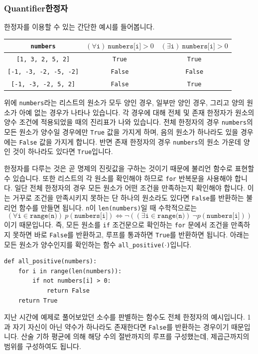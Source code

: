 \documentclass[../main.tex]{subfiles}
\begin{document}
\subsubsection{Quantifier한정자}
한정자를 이용할 수 있는 간단한 예시를 들어봅니다.
\begin{table}[H]
    \centering
    \begin{tabular}{c|c|c}
        \texttt{numbers} & $(\forall \texttt{i})\ \texttt{numbers[i]}>0$ & $(\exists \texttt{i})\ \texttt{numbers[i]}>0$\\ \hline
        \texttt{[1, 3, 2, 5, 2]} & \texttt{True} & \texttt{True}\\
        \texttt{[-1, -3, -2, -5, -2]} & \texttt{False} & \texttt{False} \\
        \texttt{[-1, -3, -2, 5, 2]} & \texttt{False} & \texttt{True}
    \end{tabular}
\end{table}
위에 \texttt{numbers}라는 리스트의 원소가 모두 양인 경우, 일부만 양인 경우, 그리고 양의 원소가 아예 없는 경우가 나타나 있습니다.
각 경우에 대해 전체 및 존재 한정자가 원소의 양수 조건에 적용되었을 때의 진리표가 나와 있습니다.
전체 한정자의 경우 \texttt{numbers}의 모든 원소가 양수일 경우에만 \texttt{True} 값을 가지게 하며, 음의 원소가 하나라도 있을 경우에는 \texttt{False} 값을 가지게 합니다.
반면 존재 한정자의 경우 \texttt{numbers}의 원소 가운데 양인 것이 하나라도 있다면 \texttt{True}입니다.

한정자를 다루는 것은 곧 명제의 진릿값을 구하는 것이기 때문에 불리언 함수로 표현할 수 있습니다.
또한 리스트의 각 원소를 확인해야 하므로 \texttt{for} 반복문을 사용해야 합니다.
일단 전체 한정자의 경우 모든 원소가 어떤 조건을 만족하는지 확인해야 합니다.
이는 거꾸로 조건을 만족시키지 못하는 단 하나의 원소라도 있다면 \texttt{False}를 반환하는 불리언 함수를 만들면 됩니다.
\texttt{n}이 \texttt{len(numbers)}일 때 수학적으로는
\[
(\forall \texttt{i} \in \texttt{range(n)})\ p(\texttt{numbers[i]}) \Leftrightarrow \neg\left((\exists \texttt{i} \in \texttt{range(n)})\ \neg p(\texttt{numbers[i]})\right)
\]
이기 때문입니다.
즉, 모든 원소를  \texttt{if} 조건문으로 확인하는 \texttt{for} 문에서 조건을 만족하지 못하면 바로 \texttt{False}를 반환하고, 루프를 통과하면 \texttt{True}를 반환하면 됩니다.
아래는 모든 원소가 양수인지를 확인하는 함수 \texttt{all\_positive($\cdot$)}입니다.
\begin{verbatim}
def all_positive(numbers):
    for i in range(len(numbers)):
        if not numbers[i] > 0:
            return False
    return True
\end{verbatim}
지난 시간에 예제로 풀어보았던 소수를 판별하는 함수도 전체 한정자의 예시입니다.
1과 자기 자신이 아닌 약수가 하나라도 존재한다면 \texttt{False}를 반환하는 경우이기 때문입니다.
산술 기하 평균에 의해 해당 수의 절반까지의 루프를 구성했는데, 제곱근까지의 범위를 구성하여도 됩니다.
\end{document}
